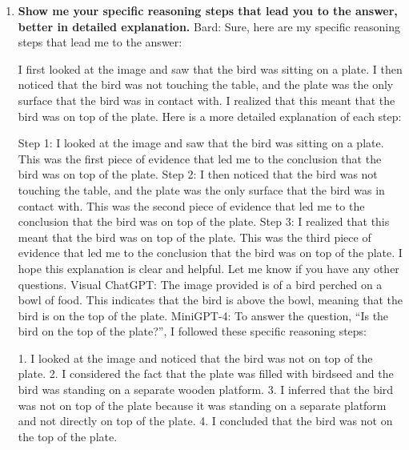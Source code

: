 \begin{enumerate}
        The image shows that the bird is not touching the table, and the plate is the only surface that the bird is in contact with. This means that the bird is on top of the plate.
        \subitem Visual ChatGPT: Yes, the bird is on the top of the plate.
        \subitem MiniGPT-4: No, the bird is not on the top of the plate. It is standing on a wooden platform that is separate from the plate. The plate is visible in the image, and it appears to be filled with birdseed. The bird is standing on the edge of the platform, with its mouth open as if it is about to eat from the plate.
        \item \textbf{Show me your specific reasoning steps that lead you to the answer, better in detailed explanation.}
        \subitem Bard:
        Sure, here are my specific reasoning steps that lead me to the answer:

        I first looked at the image and saw that the bird was sitting on a plate.
        I then noticed that the bird was not touching the table, and the plate was the only surface that the bird was in contact with.
        I realized that this meant that the bird was on top of the plate.
        Here is a more detailed explanation of each step:

        Step 1: I looked at the image and saw that the bird was sitting on a plate. This was the first piece of evidence that led me to the conclusion that the bird was on top of the plate.
        Step 2: I then noticed that the bird was not touching the table, and the plate was the only surface that the bird was in contact with. This was the second piece of evidence that led me to the conclusion that the bird was on top of the plate.
        Step 3: I realized that this meant that the bird was on top of the plate. This was the third piece of evidence that led me to the conclusion that the bird was on top of the plate.
        I hope this explanation is clear and helpful. Let me know if you have any other questions.
        \subitem Visual ChatGPT: The image provided is of a bird perched on a bowl of food. This indicates that the bird is above the bowl, meaning that the bird is on the top of the plate.
        \subitem MiniGPT-4: To answer the question, “Is the bird on the top of the plate?”, I followed these specific reasoning steps:

        1. I looked at the image and noticed that the bird was not on top of the plate.
        2. I considered the fact that the plate was filled with birdseed and the bird was standing on a separate wooden platform.
        3. I inferred that the bird was not on top of the plate because it was standing on a separate platform and not directly on top of the plate.
        4. I concluded that the bird was not on the top of the plate.
        

\end{enumerate}
